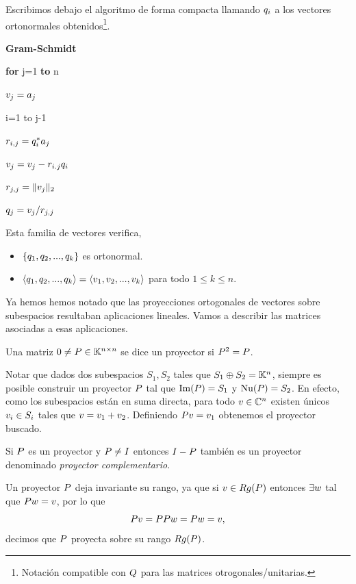 Escribimos debajo el algoritmo de forma compacta llamando $\qb_i$ a los vectores ortonormales obtenidos\footnote{Notación compatible con $\Qb$ para las matrices otrogonales/unitarias.}.


\begin{center}
\begin{tcolorbox}[width=\linewidth/3]
\begin{center}
{\bf Gram-Schmidt}
\end{center}


{\bf for} j=1 {\bf to} n

\qquad $\vb_j=\ab_j$

 i=1 to j-1

\qquad\qquad $r_{i,j}=\qb_i^*\ab_j$

\qquad\qquad  $\vb_j=\vb_j-r_{i.j}
\qb_i$


\qquad$r_{j,j}=\|\vb_j\|_2$

\qquad$\qb_{j}=\vb_j/r_{j,j}$

\end{tcolorbox}
\end{center}
Esta familia de vectores verifica,
\begin{itemize}
 \item $\{\qb_1,\qb_2,...,\qb_k\}$ es ortonormal.
 \item $\langle\qb_1,\qb_2,...,\qb_k\rangle=\langle\vb_1,\vb_2,..., \vb_k\rangle$ para todo $1\le k\le n$.
\end{itemize}

Ya hemos hemos notado que las proyecciones ortogonales de vectores sobre subespacios  resultaban aplicaciones lineales.  Vamos a describir las matrices asociadas a esas aplicaciones.
\tccdefi
\begin{definicion}
Una matriz $\cero \neq \Pb\in \Knn$ se dice un proyector si
$\Pb^2=\Pb$.
\end{definicion}
\etcc

Notar que  dados dos subespacios $S_1,S_2$ tales que $S_1\oplus S_2=\mathbb K^{n}$, siempre es posible construir un proyector $\Pb$ tal que $\Im(\Pb)=S_1$ y $\Nu(\Pb)=S_2$. En efecto, como los subespacios están en suma directa, para todo $\vb\in \Cn$ existen únicos $\vb_i\in S_i$ tales que
$\vb=\vb_1+\vb_2$. Definiendo $\Pb\vb=\vb_1$ obtenemos el proyector buscado.

Si $\Pb$ es un proyector y $\Pb\neq \Ib$ entonces $\Ib-\Pb$ también es un proyector denominado \emph{proyector complementario}.

Un proyector $\Pb$ deja invariante su rango, ya que si $\vb\in Rg(\Pb)$ entonces $\exists \wb$ tal que  $\Pb\wb=\vb$, por lo que
$$
\Pb\vb=\Pb\Pb\wb=\Pb\wb=\vb,
$$
decimos que $\Pb$ proyecta sobre su rango $Rg(\Pb)$.

